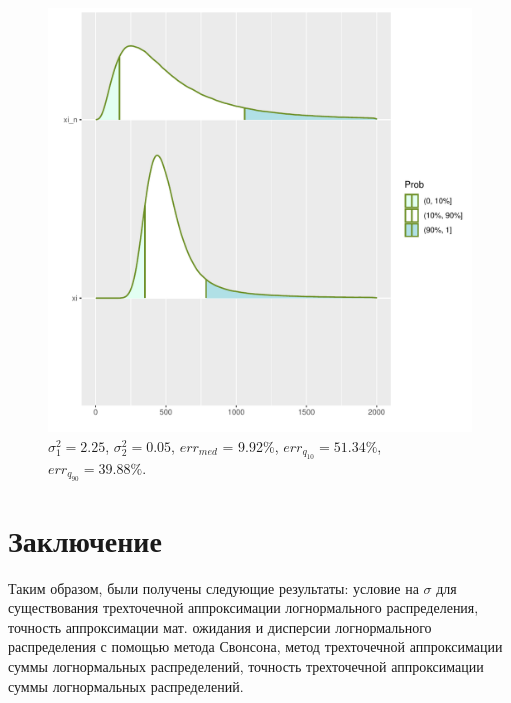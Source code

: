 \documentclass[12pt]{article}
\begin{document}
\begin{figure}[!hhh]
	\begin{center}
		\begin{minipage}[h]{0.95\linewidth}
			\includegraphics[width=1\linewidth]{img/par_1.pdf}
			\caption{$\sigma_{1}^{2} = 2.25$, $\sigma_{2}^{2} = 0.05$, $err_{med}$ = 9.92\%,  $err_{q_{10}} = 51.34\%$,  $err_{q_{90}} = 39.88\%$. } %
			\label{ris7} %
		\end{minipage}
		
	\end{center}
\end{figure}


	
	\section{Заключение}
	
	Таким образом, были получены следующие результаты: условие на $\sigma$ для существования трехточечной аппроксимации логнормального распределения, точность аппроксимации мат. ожидания и дисперсии логнормального распределения с помощью метода Свонсона, метод трехточечной аппроксимации суммы логнормальных распределений, точность трехточечной аппроксимации суммы логнормальных распределений.
	
\end{document}
